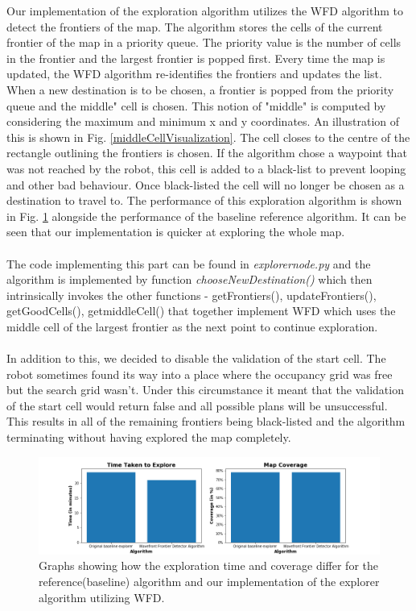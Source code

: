 \documentclass[a4paper,12pt]{article}
\begin{document}
				Our implementation of the exploration algorithm utilizes the WFD algorithm to detect the frontiers of the map. The algorithm stores the cells of the current frontier of the map in a priority queue. The priority value is the number of cells in the frontier and the largest frontier is popped first. Every time the map is updated, the WFD algorithm re-identifies the frontiers and updates the list. When a new destination is to be chosen, a frontier is popped from the priority queue and the middle" cell is chosen. This notion of "middle" is computed by considering the maximum and minimum x and y coordinates. An illustration of this is shown in Fig. \ref{middleCellVisualization}. The cell closes to the centre of the rectangle outlining the frontiers is chosen. If the algorithm chose a waypoint that was not reached by the robot, this cell is added to a black-list to prevent looping and other bad behaviour. Once black-listed the cell will no longer be chosen as a destination to travel to. The performance of this exploration algorithm is shown in Fig. \ref{Part2} alongside the performance of the baseline reference algorithm. It can be seen that our implementation is quicker at exploring the whole map. 
				\\
				\\
				The code implementing this part can be found in \textit{explorer\textunderscore node.py} and the algorithm is implemented by function \textit{chooseNewDestination()} which then intrinsically invokes the other functions - getFrontiers(), updateFrontiers(), getGoodCells(), getmiddleCell() that together implement WFD which uses the middle cell of the largest frontier as the next point to continue exploration.
				\\
				\\
				In addition to this, we decided to disable the validation of the start cell. The robot sometimes found its way into a place where the occupancy grid was free but the search grid wasn't. Under this circumstance it meant that the validation of the start cell would return false and all possible plans will be unsuccessful. This results in all of the remaining frontiers being black-listed and the algorithm terminating without having explored the map completely. 

				\begin{figure}[H]
					\centering
					\includegraphics[scale=0.5]{images/Part2.png}
					\caption{Graphs showing how the exploration time and coverage differ for the reference(baseline) algorithm and our implementation of the explorer algorithm utilizing WFD.}
					\label{Part2}
				\end{figure}
\end{document}
